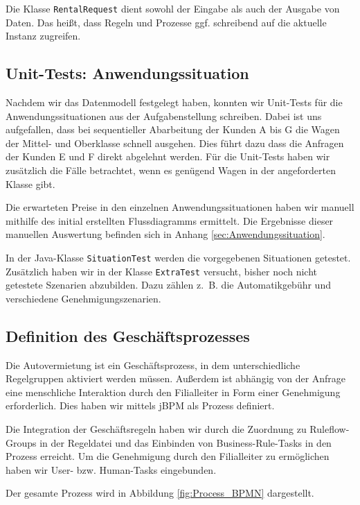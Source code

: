 Die Klasse \texttt{RentalRequest} dient sowohl der Eingabe als auch der Ausgabe von Daten.
Das heißt, dass Regeln und Prozesse ggf. schreibend auf die aktuelle Instanz zugreifen.

\subsection{Unit-Tests: Anwendungssituation}

Nachdem wir das Datenmodell festgelegt haben, konnten wir Unit-Tests für die 
Anwendungssituationen aus der Aufgabenstellung schreiben. Dabei ist uns aufgefallen,
dass bei sequentieller Abarbeitung der Kunden A bis G die Wagen der Mittel- und
Oberklasse schnell ausgehen. Dies führt dazu dass die Anfragen der Kunden E und F
direkt abgelehnt werden. Für die Unit-Tests haben wir zusätzlich die Fälle betrachtet,
wenn es genügend Wagen in der angeforderten Klasse gibt.

Die erwarteten Preise in den einzelnen Anwendungssituationen haben wir manuell
mithilfe des initial erstellten Flussdiagramms ermittelt. Die Ergebnisse dieser
manuellen Auswertung befinden sich in Anhang \ref{sec:Anwendungssituation}.

In der Java-Klasse \texttt{SituationTest} werden die vorgegebenen Situationen getestet.
Zusätzlich haben wir in der Klasse \texttt{ExtraTest} versucht, bisher noch nicht
getestete Szenarien abzubilden. Dazu zählen z.~B. die Automatikgebühr und verschiedene
Genehmigungszenarien.

\subsection{Definition des Geschäftsprozesses}

Die Autovermietung ist ein Geschäftsprozess, in dem unterschiedliche Regelgruppen aktiviert
werden müssen. Außerdem ist abhängig von der Anfrage eine menschliche Interaktion durch den
Filialleiter in Form einer Genehmigung erforderlich. Dies haben wir mittels
jBPM als Prozess definiert.

Die Integration der Geschäftsregeln haben wir durch die Zuordnung zu Ruleflow-Groups
in der Regeldatei und das Einbinden von Business-Rule-Tasks in den Prozess erreicht.
Um die Genehmigung durch den Filialleiter zu ermöglichen haben wir User- bzw.
Human-Tasks eingebunden.

Der gesamte Prozess wird in Abbildung \ref{fig:Process_BPMN} dargestellt.

